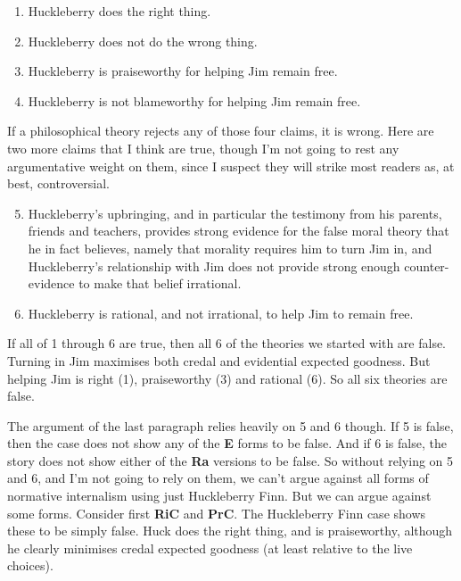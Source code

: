 \begin{enumerate}
\item{} \gls{Huck}leberry does the right thing.

\item{} \gls{Huck}leberry does not do the wrong thing.

\item{} \gls{Huck}leberry is praiseworthy for helping Jim remain free.

\item{} \gls{Huck}leberry is not blameworthy for helping Jim remain free.

\end{enumerate}
If a philosophical theory rejects any of those four claims, it is wrong. Here are two more claims that I think are true, though I'm not going to rest any argumentative weight on them, since I suspect they will strike most readers as, at best, controversial.

\begin{enumerate}
\setcounter{enumi}{4}
\item Huckleberry's upbringing, and in particular the testimony from his parents, friends and teachers, provides strong evidence for the false moral theory that he in fact believes, namely that morality requires him to turn Jim in, and Huckleberry's relationship with Jim does not provide strong enough counter-evidence to make that belief irrational.
\item Huckleberry is rational, and not irrational, to help Jim to remain free.
\end{enumerate}

\noindent If all of 1 through 6 are true, then all 6 of the theories we started with are false. Turning in Jim maximises both credal and evidential expected goodness. But helping Jim is right (1), praiseworthy (3) and rational (6). So all six theories are false.

The argument of the last paragraph relies heavily on 5 and 6 though. If 5 is false, then the case does not show any of the \textbf{E} forms to be false. And if 6 is false, the story does not show either of the \textbf{Ra} versions to be false. So without relying on 5 and 6, and I'm not going to rely on them, we can't argue against all forms of normative internalism using just \gls{Huck}leberry Finn. But we can argue against some forms. Consider first \textbf{RiC} and \textbf{PrC}. The \gls{Huck}leberry Finn case shows these to be simply false. \gls{Huck} does the right thing, and is praiseworthy, although he clearly minimises credal expected goodness (at least relative to the live choices).

